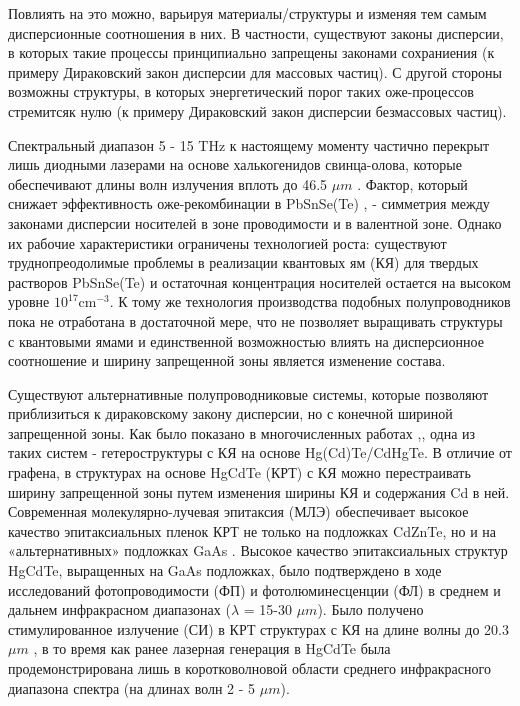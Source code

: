 \documentclass[../main.tex]{subfiles}
\begin{document}
Повлиять на это можно, варьируя материалы/структуры и изменяя тем самым дисперсионные соотношения в них. В частности,
существуют законы дисперсии, в которых такие процессы принципиально запрещены законами сохраниения (к примеру Дираковский 
закон дисперсии для массовых частиц). С другой стороны возможны структуры, в которых энергетический порог таких оже-процессов 
стремитсяк нулю (к примеру Дираковский закон дисперсии безмассовых частиц).

Спектральный диапазон 5 - 15 THz к настоящему моменту частично 
перекрыт лишь диодными лазерами на основе халькогенидов свинца-олова, которые обеспечивают длины 
волн излучения вплоть до 46.5 $\mu m$ \cite{Intro8}. Фактор, который снижает эффективность оже-рекомбинации в PbSnSe(Te) \cite{Intro1}, \cite{Intro9}
- симметрия между законами дисперсии носителей в зоне проводимости и в валентной зоне. Однако их рабочие характеристики 
ограничены технологией роста: существуют труднопреодолимые проблемы в реализации квантовых ям (КЯ) для твердых растворов 
PbSnSe(Te) и остаточная концентрация носителей остается на высоком уровне $10^{17} \text{cm}^{-3}$. К тому же технология производства подобных
полупроводников пока не отработана в достаточной мере, что не позволяет выращивать структуры с квантовыми ямами и единственной возможностью
влиять на дисперсионное соотношение и ширину запрещенной зоны является изменение состава.

Существуют альтернативные полупроводниковые системы, которые позволяют
приблизиться к дираковскому закону дисперсии, но с конечной шириной запрещенной зоны. 
Как было показано в многочисленных работах \cite{Rumyantsev:IOP:2018},\cite{Rumyantsev:2019}, одна из таких систем - гетероструктуры с КЯ на основе Hg(Cd)Te/CdHgTe. 
В отличие от графена, в структурах на основе HgCdTe (КРТ) с КЯ можно перестраивать ширину запрещенной зоны путем изменения ширины КЯ и 
содержания Cd в ней. Современная молекулярно-лучевая эпитаксия (МЛЭ) обеспечивает высокое качество эпитаксиальных пленок КРТ не только на подложках CdZnTe, 
но и на «альтернативных» подложках GaAs \cite{Varavin:2003}. Высокое качество эпитаксиальных структур HgCdTe, выращенных на GaAs подложках, было подтверждено в ходе исследований 
фотопроводимости (ФП) и фотолюминесценции (ФЛ) в среднем и дальнем инфракрасном диапазонах ($λ$ = 15-30 $\mu m$). Было получено 
стимулированное излучение (СИ) в КРТ структурах с КЯ на длине волны до 20.3 $\mu m$ \cite{Rumyantsev:IOP:2018}, в то время как ранее лазерная генерация в HgCdTe была 
продемонстрирована лишь в коротковолновой области среднего инфракрасного диапазона спектра (на длинах волн 2 - 5 $\mu m$). 
\end{document}
